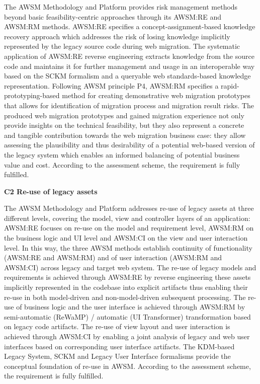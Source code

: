 The AWSM Methodology and Platform provides risk management methods beyond basic feasibility-centric approaches through its AWSM:RE and AWSM:RM methods.
AWSM:RE specifies a concept-assignment-based knowledge recovery approach which addresses the risk of losing knowledge implicitly represented by the legacy source code during web migration.
The systematic application of AWSM:RE reverse engineering extracts knowledge from the source code and maintains it for further management and usage in an interoperable way based on the SCKM formalism and a queryable web standards-based knowledge representation.
Following AWSM principle P4, AWSM:RM specifies a rapid-prototyping-based method for creating demonstrative web migration prototypes that allows for identification of migration process and migration result risks.
The produced web migration prototypes and gained migration experience not only provide insights on the technical feasibility, but they also represent a concrete and tangible contribution towards the web migration business case: they allow assessing the plausibility and thus desirability of a potential web-based version of the legacy system which enables an informed balancing of potential business value and cost.
According to the assessment scheme, the requirement is fully fulfilled.

\textbf{C2 Re-use of legacy assets}

The AWSM Methodology and Platform addresses re-use of legacy assets at three different levels, covering the model, view and controller layers of an application: AWSM:RE focuses on re-use on the model and requirement level, AWSM:RM on the business logic and UI level and AWSM:CI on the view and user interaction level.
In this way, the three AWSM methods establish continuity of functionality (AWSM:RE and AWSM:RM) and of user interaction (AWSM:RM and AWSM:CI) across legacy and target web system.
The re-use of legacy models and requirements is achieved through AWSM:RE by reverse engineering these assets implicitly represented in the codebase into explicit artifacts thus enabling their re-use in both model-driven and non-model-driven subsequent processing.
The re-use of business logic and the user interface is achieved through AWSM:RM by semi-automatic (ReWaMP) / automatic (UI Transformer) transformation based on legacy code artifacts.
The re-use of view layout and user interaction is achieved through AWSM:CI by enabling a joint analysis of legacy and web user interfaces based on corresponding user interface artifacts.
The KDM-based Legacy System, SCKM and Legacy User Interface formalisms provide the conceptual foundation of re-use in AWSM.
According to the assessment scheme, the requirement is fully fulfilled.

